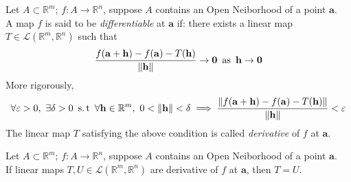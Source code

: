 \documentclass[twoside,openright]{report}
\begin{document}
\begin{definition}
    Let $A \subset \mathbb{R}^m$; $f:A \to \mathbb{R}^n$, suppose $A$ contains an Open Neiborhood of a point $\mathbf{a}$. \\
    A map $f$ is said to be \textit{differentiable} at $\mathbf{a}$ if: there exists a linear map $T \in \mathcal{L}(\mathbb{R}^m, \mathbb{R}^n)$ such that
    \begin{align*}
        \frac{f(\mathbf{a} + \mathbf{h}) - f(\mathbf{a}) - T(\mathbf{h})}{\|\mathbf{h}\|} \to \mathbf{0} \ \operatorname{as} \  \mathbf{h} \to \mathbf{0}
    \end{align*}
    More rigorously,
    \begin{align*}
        \forall \varepsilon > 0,\
        \exists \delta >0 \ \operatorname{s.t} \ 
        \forall \mathbf{h} \in \mathbb{R}^m,\
        0 < \|\mathbf{h}\| < \delta \implies \frac{\|f(\mathbf{a} + \mathbf{h}) - f(\mathbf{a}) - T(\mathbf{h})\|}{\|\mathbf{h}\|} < \varepsilon
    \end{align*}
    The linear map $T$ satisfying the above condition is called \textit{derivative} of $f$ at $\mathbf{a}$.
\end{definition}
\begin{lemma}
    Let $A \subset \mathbb{R}^m$; $f:A \to \mathbb{R}^n$, suppose $A$ contains an Open Neiborhood of a point $\mathbf{a}$. \\
    If linear maps $T, U \in \mathcal{L}(\mathbb{R}^m, \mathbb{R}^n)$ are derivative of $f$ at $\mathbf{a}$, then $T = U$.
\end{lemma}
\end{document}
